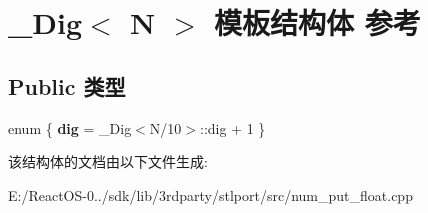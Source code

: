 \hypertarget{struct___dig}{}\section{\+\_\+\+Dig$<$ N $>$ 模板结构体 参考}
\label{struct___dig}
\subsection*{Public 类型}
\begin{DoxyCompactItemize}
\item 
\mbox{\label{struct___dig_afd847b123e8c6fbafabae5bde8cb2db4}} 
enum \{ {\bfseries dig} = \+\_\+\+Dig$<$N/10$>$\+:\+:dig + 1
 \}
\end{DoxyCompactItemize}


该结构体的文档由以下文件生成\+:\begin{DoxyCompactItemize}
\item 
E\+:/\+React\+O\+S-\/0../sdk/lib/3rdparty/stlport/src/num\+\_\+put\+\_\+float.\+cpp\end{DoxyCompactItemize}
